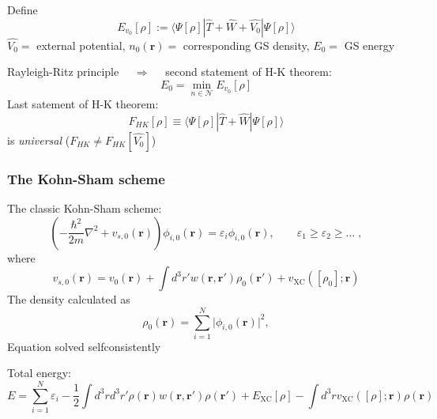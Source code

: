 \documentclass[compress]{beamer}
\newcommand*{\ket}[1]{|#1\rangle}
\newcommand*{\bra}[1]{\langle#1|}
\begin{document}
\frame
{ 
\frametitle{}
\begin{small}
{\scriptsize
    
Define
\begin{equation}
  E_{v_{0}}[\rho]:=\bra{\Psi[\rho]}\hat{T}+\hat{W}+\hat{V_{0}}\ket{\Psi[\rho]} \nonumber
\end{equation}
$\hat{V_{0}} =$ external potential, $n_{0}(\mathbf{r}) =$ corresponding GS density, $E_{0} =$ GS energy

\vspace{2mm}
Rayleigh-Ritz principle $\quad \Longrightarrow \quad $ \alert{second statement of H-K theorem}:
\begin{equation}
  E_{0}=\min_{n\in \mathcal{N}}E_{v_{0}}[\rho] \nonumber
\end{equation}
\alert{Last satement of H-K theorem}:
\begin{equation}
  F_{HK}[\rho]\equiv \bra{\Psi[\rho]}\hat{T}+\hat{W}\ket{\Psi[\rho]} \nonumber
\end{equation}
is \emph{universal} ($F_{HK}\neq F_{HK}[\hat{V_{0}}]$)
} 
\end{small}
}



\frame
{ 
  \frametitle{The Kohn-Sham scheme }
  \begin{small}
    {\scriptsize
      The \alert{classic Kohn-Sham} scheme:
      \begin{equation}
         \left(-\frac{\hbar^{2}}{2m}\nabla^{2}+v_{s,0}(\mathbf{r})\right)\phi_{i,0}(\mathbf{r})=\varepsilon_{i}\phi_{i,0}(\mathbf{r}), \qquad \varepsilon_{1}\geq \varepsilon_{2} \geq \dots \;, \nonumber
      \end{equation}
      where
      \begin{equation}
        v_{s,0}(\mathbf{r})=v_{0}(\mathbf{r})+\int d^{3}r' w(\mathbf{r},\mathbf{r}')\rho_{0}(\mathbf{r}')+v_{\mathrm{XC}}([\rho_{0}];\mathbf{r}) \nonumber 
      \end{equation}
      The density calculated as 
      \begin{equation}
        \rho_{0}(\mathbf{r})=\sum_{i=1}^{N}\vert \phi_{i,0}(\mathbf{r})\vert^{2}, \nonumber
      \end{equation}
      Equation \alert{solved selfconsistently} 

      Total energy: 
      \begin{equation}
        E=\sum_{i=1}^{N}\varepsilon_{i}-\frac{1}{2}\int d^{3}r d^{3}r'\rho(\mathbf{r})w(\mathbf{r},\mathbf{r}')\rho(\mathbf{r}')+E_{\mathrm{XC}}[\rho]-\int d^{3}r v_{\mathrm{XC}}([\rho];\mathbf{r})\rho(\mathbf{r}) \nonumber
      \end{equation}
    }
  \end{small}
}
\end{document}
